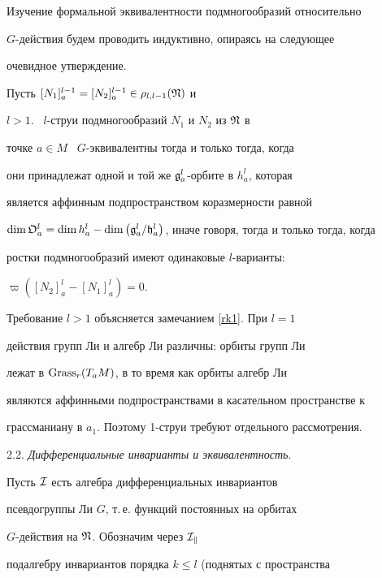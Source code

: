 Изучение формальной эквивалентности подмногообразий относительно


$G$-действия будем проводить индуктивно, опираясь на следующее


очевидное утверждение.





\begin{prop}


Пусть $[N_1]^{l-1}_a=[N_2]^{l-1}_a\in\rho_{l,l-1}(\frak{N})$ и


$l>1$. \ $l$-струи подмногообразий $N_1$ и $N_2$ из $\frak{N}$ в


точке $a\in M$ \ $G$-эквивалентны тогда и только тогда, когда


они принадлежат одной и той же ${\frak g}^l_a$-орбите в $h_a^l$, которая


является аффинным подпространством коразмерности равной


$\dim{\frak O}_a^l=\dim h_a^l- \dim\big(\g^l_a/{\frak


h}^l_a\big)$, иначе говоря, тогда и только тогда, когда


ростки подмногообразий имеют одинаковые $l$-варианты\/${:}$


$\varpi([N_2]_a^l-[N_1]_a^l)=0$. 


\end{prop}





Требование $l>1$ объясняется замечанием \ref{rk1}. При $l=1$


действия групп Ли и алгебр Ли различны: орбиты групп Ли


лежат в $\operatorname{Grass}_r(T_aM)$, в то время как орбиты алгебр Ли


являются аффинными подпространствами в касательном пространстве к


грассманиану в $a_1$. Поэтому 1-струи требуют отдельного рассмотрения.


\medskip





2.2. {\it Дифференциальные инварианты и эквивалентность}.


Пусть $\cal{I}$ есть алгебра дифференциальных инвариантов


псевдогруппы Ли $G$, т.\,е. функций постоянных на орбитах


$G$-действия на $\frak{N}$. Обозначим через $\cal{I}_k$


подалгебру инвариантов порядка $k\le l$ (поднятых с пространства


